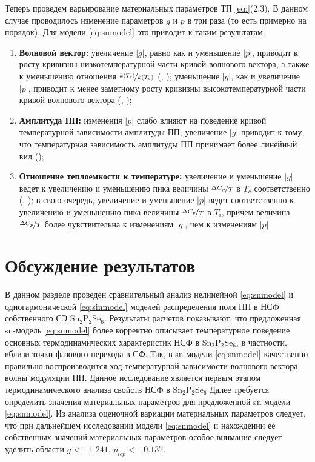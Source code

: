 Теперь проведем варьирование материальных параметров ТП \eqref{eq:}(2.3). В данном случае проводилось изменение параметров $g$ и $p$ в три раза (то есть примерно на порядок). Для модели \eqref{eq:snmodel} это приводит к таким результатам.
\begin{enumerate}
\item
\textbf{Волновой вектор:} увеличение $|g|$, равно как и уменьшение $|p|$, приводит к росту кривизны низкотемпературной части кривой волнового вектора, а также к уменьшению отношения $\nicefrac{k(T_i)}{k(T_c)}$ (, ); уменьшение $|g|$, как и увеличение $|p|$, приводит к менее заметному росту кривизны высокотемпературной части кривой волнового вектора (, );
\item
\textbf{Амплитуда ПП:} изменения $|p|$ слабо влияют на поведение кривой температурной зависимости амплитуды ПП; увеличение $|g|$ приводит к тому, что температурная зависимость амплитуды ПП принимает более линейный вид ();
\item
\textbf{Отношение теплоемкости к температуре:} увеличение и уменьшение $|g|$ ведет к увеличению и уменьшению пика величины $\nicefrac{\Delta C_p}{T}$ в $T_c$ соответственно (, ); в свою очередь, увеличение и уменьшение $|p|$ ведет соответственно к увеличению и уменьшению пика величины $\nicefrac{\Delta C_p}{T}$ в $T_i$, причем величина $\nicefrac{\Delta C_p}{T}$ более чувствительна к изменениям $|g|$, чем к изменениям $|p|$.
\end{enumerate}



\section{Обсуждение результатов}\label{sec:discuss}

В данном разделе проведен сравнительный анализ нелинейной \eqref{eq:snmodel} и одногармонической \eqref{eq:sinmodel} моделей распределения поля ПП в НСФ собственного СЭ Sn$_2$P$_2$Se$_6$. Результаты расчетов показывают, что предложенная sn-модель \eqref{eq:snmodel} более корректно описывает температурное поведение основных термодинамических характеристик НСФ в Sn$_2$P$_2$Se$_6$, в частности, вблизи точки фазового перехода в СФ. Так, в sn-модели \eqref{eq:snmodel} качественно правильно воспроизводится ход температурной зависимости волнового вектора волны модуляции ПП.
Данное исследование является первым этапом термодинамического анализа свойств НСФ в Sn$_2$P$_2$Se$_6$ Далее требуется определить значения материальных параметров для предложенной sn-модели \eqref{eq:snmodel}. Из анализа оценочной вариации материальных параметров следует, что при дальнейшем исследовании модели \eqref{eq:snmodel} и нахождении ее собственных значений материальных параметров особое внимание следует уделить области $g < -1.241,\, p_{icp} < -0.137$.
